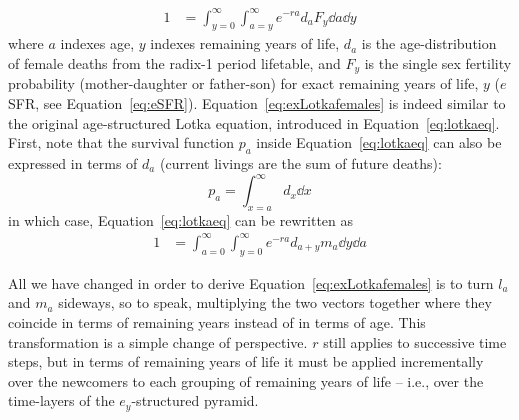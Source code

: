\begin{align}
\label{eq:exLotkafemales}
1 &= \int _{y=0}^\infty \int _{a=y}^\infty e^{-ra} d_{a} F_{y} \dd a \dd y
\end{align}
where $a$ indexes age, $y$ indexes remaining years of life,
$d_{a}$ is the age-distribution of female deaths from the radix-1 period
lifetable, and $F_{y}$ is the single sex fertility probability
(mother-daughter or father-son) for exact remaining years of
life, $y$ ($e$SFR, see Equation~\eqref{eq:eSFR}).
Equation~\eqref{eq:exLotkafemales} is indeed similar to the original
age-structured Lotka equation, introduced in Equation~\eqref{eq:lotkaeq}. First, note that the survival function $p_a$
inside Equation~\eqref{eq:lotkaeq} can also be expressed in terms of
$d_a$ (current livings are the sum of future deaths):
\begin{equation}
p_a = \int _{x = a} ^\infty d_x \dd x
\end{equation}
in which case, Equation~\ref{eq:lotkaeq} can be rewritten as
\begin{align}
\label{eq:lotkadx}
1 &= \int _{a=0}^\infty \int _{y = 0}^\infty e^{-ra} d_{a+y} m_a \dd y \dd a
\end{align}

All we have changed in order to derive Equation~\eqref{eq:exLotkafemales}
is to turn $l_a$ and $m_a$ sideways, so to speak, multiplying the two vectors
together where they coincide in terms of remaining years instead of in terms of age. This
transformation is a simple change of perspective. $r$ still applies to
successive time steps, but in terms of remaining years of life it must be applied incrementally 
over the newcomers to
each grouping of remaining years of life -- i.e., over the time-layers of the
$e_y$-structured pyramid.
